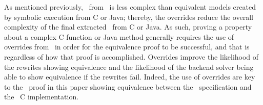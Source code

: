 As mentioned previously, \sawcore\ from \cryptol\ is less complex than equivalent models created by symbolic execution from C or Java;
thereby, the overrides reduce the overall complexity of the final extracted \sawcore\ from C or Java.
As such, proving a property about a complex C function or Java method generally requires the use of overrides from \cryptol\ in order for the equivalence proof to be successful, and that is regardless of how that proof is accomplished.
Overrides improve the likelihood of the rewrites showing equivalence and the likelihood of the backend solver being able to show equivalence if the rewrites fail.
Indeed, the use of overrides are key to the \saw\ proof in this paper showing equivalence between the \shaThree\ specification and the \openssl\ C implementation.
